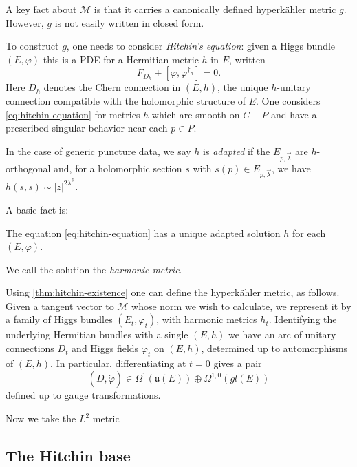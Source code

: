 \documentclass[12pt,letterpaper,reqno]{article}
\numberwithin{equation}{section}
\newcommand{\fu}{{\mathfrak u}}
\newcommand{\cM}{\ensuremath{\mathcal M}}
\newcommand{\R}{\ensuremath{\mathbb R}}
\newcommand{\hk}{hyperk\"ahler\xspace}
\newcommand{\abs}[1]{\lvert#1\rvert}
\newcommand{\ti}[1]{\textit{#1}}
\newcommand{\fixme}[1]{{\color{orange}{[#1]}}}
\begin{document}
A key fact about $\cM$ is that it carries a canonically
defined \hk metric $g$. However, $g$ is not easily
written in closed form.

To construct $g$, one needs to consider \ti{Hitchin's equation}:
given a Higgs bundle $(E,\varphi)$ this is a PDE
for a Hermitian metric $h$ in $E$, written
\begin{equation} \label{eq:hitchin-equation}
  F_{D_h} + [\varphi, \varphi^{\dagger_h}] = 0.
\end{equation}
Here $D_h$ denotes the Chern connection in $(E,h)$,
the unique $h$-unitary connection compatible with
the holomorphic structure of $E$.
\fixme{write local coordinates?}
One considers \eqref{eq:hitchin-equation} for
metrics $h$ which are smooth on $C - P$ and
have a prescribed singular behavior near each
$p \in P$.
\begin{defn} 
In the case of generic puncture data, we say $h$ is
\ti{adapted} if the $E_{p,\vec\lambda}$ are $h$-orthogonal
and, for a holomorphic section $s$ with
$s(p) \in E_{p,\vec\lambda}$, we have
$h(s,s) \sim \abs{z}^{2 \lambda^\R}$.
\end{defn}
\fixme{in general need logs determined by the Jordan
block structure of $\varphi$}

A basic fact is: \fixme{refs: Simpson}
\begin{thm} \label{thm:hitchin-existence}
The equation \eqref{eq:hitchin-equation} has a unique \fixme{fix scalar multiple?}
adapted solution $h$ for each $(E,\varphi)$.
\end{thm}
We call the solution the \ti{harmonic metric}.

Using \autoref{thm:hitchin-existence}
one can define the \hk metric, as follows.
Given a tangent vector to $\cM$ whose norm we wish to calculate,
we represent it by a family of Higgs bundles
$(E_t,\varphi_t)$, with harmonic metrics $h_t$.
Identifying the underlying Hermitian bundles with a single $(E,h)$
we have an arc of unitary connections $D_t$ and Higgs fields
$\varphi_t$ on $(E,h)$, determined up to automorphisms of $(E,h)$.
In particular, differentiating at $t = 0$ gives a pair
\begin{equation}
(\dot D, \dot \varphi) \in \Omega^1(\fu(E)) \oplus \Omega^{1,0}(gl(E))
\end{equation}
defined up to gauge transformations.

Now we take the $L^2$ metric \fixme{...}


\subsection{The Hitchin base}
\end{document}
